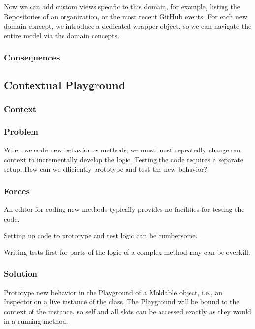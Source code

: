 \documentclass[sigconf]{acmart}
\begin{document}
Now we can add custom views specific to this domain, for example, listing the Repositories of an organization, or the most recent GitHub events. For each new domain concept, we introduce a dedicated wrapper object, so we can navigate the entire model via the domain concepts.

\subsubsection*{Consequences}

\subsection*{Contextual Playground}\label{pat:contextualPlayground}
\subsubsection*{Context}
\subsubsection*{Problem}

When we code new behavior as methods, we must must repeatedly change our context to incrementally develop the logic. Testing the code requires a separate setup. How can we efficiently prototype and test the new behavior?

\subsubsection*{Forces}

An editor for coding new methods typically provides no facilities for testing the code.

Setting up code to prototype and test logic can be cumbersome.

Writing tests first for parts of the logic of a complex method may can be overkill.

\subsubsection*{Solution}

Prototype new behavior in the Playground of a Moldable object, i.e., an Inspector on a live instance of the class. The Playground will be bound to the context of the instance, so self and all slots can be accessed exactly as they would in a running method.
\end{document}

